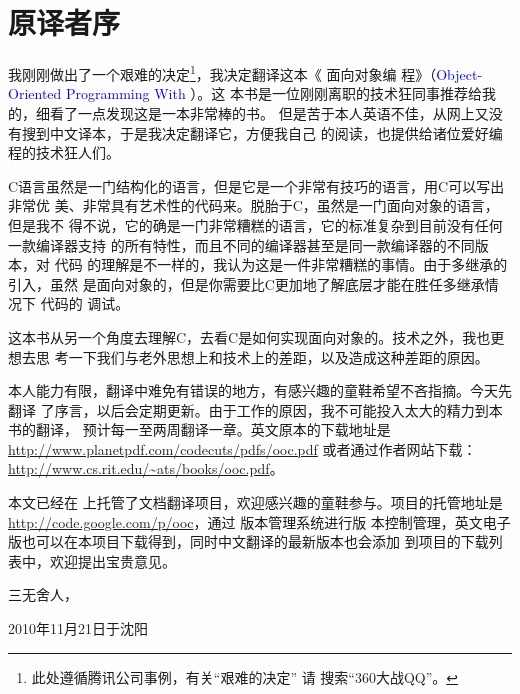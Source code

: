 

\chapter{原译者序}
\label{ch:TransPreface}

我刚刚做出了一个艰难的决定\footnote{此处遵循腾讯公司事例，有关“艰难的决定”
请 \Google{} 搜索“360大战QQ”。}，我决定翻译这本《 面向对象编
程》（\textcolor{blue}{Object-Oriented Programming With }）。这
本书是一位刚刚离职的技术狂同事推荐给我的，细看了一点发现这是一本非常棒的书。
但是苦于本人英语不佳，从网上又没有搜到中文译本，于是我决定翻译它，方便我自己
的阅读，也提供给诸位爱好编程的技术狂人们。

C语言虽然是一门结构化的语言，但是它是一个非常有技巧的语言，用C可以写出非常优
美、非常具有艺术性的代码来。\cpp 脱胎于C，虽然是一门面向对象的语言，但是我不
得不说，它的确是一门非常糟糕的语言，它的标准复杂到目前没有任何一款编译器支持
\cpp 的所有特性，而且不同的编译器甚至是同一款编译器的不同版本，对 \cpp 代码
的理解是不一样的，我认为这是一件非常糟糕的事情。由于多继承的引入，虽然 \cpp
是面向对象的，但是你需要比C更加地了解底层才能在胜任多继承情况下 \cpp 代码的
调试。

这本书从另一个角度去理解C，去看C是如何实现面向对象的。技术之外，我也更想去思
考一下我们与老外思想上和技术上的差距，以及造成这种差距的原因。

本人能力有限，翻译中难免有错误的地方，有感兴趣的童鞋希望不吝指摘。今天先翻译
了序言，以后会定期更新。由于工作的原因，我不可能投入太大的精力到本书的翻译，
预计每一至两周翻译一章。英文原本的下载地址是
\url{http://www.planetpdf.com/codecuts/pdfs/ooc.pdf}
或者通过作者网站下载：\url{http://www.cs.rit.edu/~ats/books/ooc.pdf}。

本文已经在 
上托管了文档翻译项目，欢迎感兴趣的童鞋参与。项目的托管地址是
\url{http://code.google.com/p/ooc}，通过 版本管理系统进行版
本控制管理，英文电子版也可以在本项目下载得到，同时中文翻译的最新版本也会添加
到项目的下载列表中，欢迎提出宝贵意见。

\bigskip
\bigskip

\begin{flushright}
    三无舍人，

    2010年11月21日于沈阳
\end{flushright}

